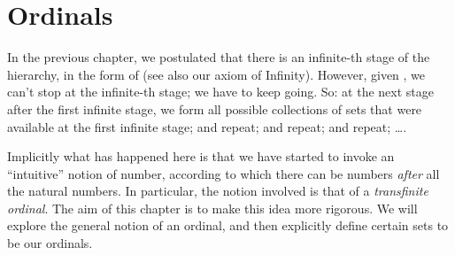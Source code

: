 \documentclass[../../../include/open-logic-chapter]{subfiles}
\begin{document}
\chapter{Ordinals}\label{ch:ordinals}

In the previous chapter, we postulated that there is an infinite-th stage of the hierarchy, in the form of \stagesinf{} (see also our axiom of Infinity). However, given \stagessucc{}, we can't stop at the infinite-th stage; we have to keep going. So: at the next stage after the first infinite stage, we form all possible collections of sets that were available at the first infinite stage; and repeat; and repeat; and repeat; \ldots.

Implicitly what has happened here is that we have started to invoke an ``intuitive'' notion of number, according to which there can be numbers \emph{after} all the natural numbers. In particular, the notion involved is that of a \emph{transfinite ordinal}. The aim of this chapter is to make this idea more rigorous. We will explore the general notion of an ordinal, and then explicitly define certain sets to be our ordinals. 


\OLEndChapterHook
\end{document}
